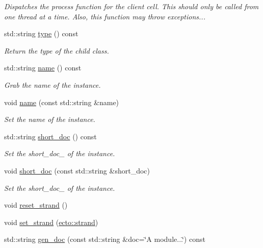 \begin{DoxyCompactItemize}
\begin{DoxyCompactList}\small\item\em Dispatches the process function for the client cell. This should only be called from one thread at a time. Also, this function may throw exceptions... \end{DoxyCompactList}\item 
std\-::string \hyperlink{structecto_1_1cell_ae3b84af61e78dab25f66a66773d5c5df}{type} () const 
\begin{DoxyCompactList}\small\item\em Return the type of the child class. \end{DoxyCompactList}\item 
std\-::string \hyperlink{structecto_1_1cell_a931fbc02fff66a58684ab25e00dbb2f8}{name} () const 
\begin{DoxyCompactList}\small\item\em Grab the name of the instance. \end{DoxyCompactList}\item 
void \hyperlink{structecto_1_1cell_a3956efb238f50a6983b86f430c47ca05}{name} (const std\-::string \&name)
\begin{DoxyCompactList}\small\item\em Set the name of the instance. \end{DoxyCompactList}\item 
std\-::string \hyperlink{structecto_1_1cell_aefa443962201caebb08d1a3163730639}{short\-\_\-doc} () const 
\begin{DoxyCompactList}\small\item\em Set the short\-\_\-doc\-\_\- of the instance. \end{DoxyCompactList}\item 
void \hyperlink{structecto_1_1cell_a49d510eec19d352c5729e6a2fd149340}{short\-\_\-doc} (const std\-::string \&short\-\_\-doc)
\begin{DoxyCompactList}\small\item\em Set the short\-\_\-doc\-\_\- of the instance. \end{DoxyCompactList}\item 
void \hyperlink{structecto_1_1cell_af32a9e2113b7afcb5b225bdc3c234e8c}{reset\-\_\-strand} ()
\item 
void \hyperlink{structecto_1_1cell_ae0009fc4a4d12d400126f455396f5c9f}{set\-\_\-strand} (\hyperlink{structecto_1_1strand}{ecto\-::strand})
\item 
std\-::string \hyperlink{structecto_1_1cell_a486454d7466c5f0373ecb42dd4e97b2f}{gen\-\_\-doc} (const std\-::string \&doc=\char`\"{}A module...\char`\"{}) const 

\end{DoxyCompactItemize}
